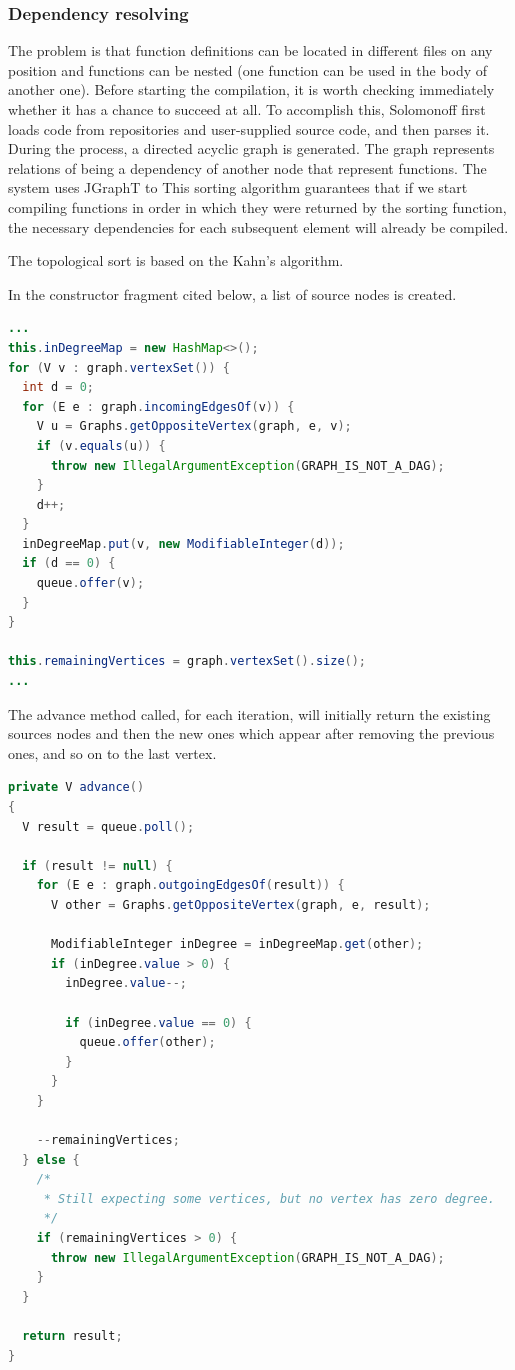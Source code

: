 \hypertarget{dependency-resolving}{%
\subsubsection{Dependency resolving}\label{dependency-resolving}}

The problem is that function definitions can be located in different
files on any position and functions can be nested (one function can be
used in the body of another one). Before starting the compilation, it is
worth checking immediately whether it has a chance to succeed at all. To
accomplish this, Solomonoff first loads code from repositories and
user-supplied source code, and then parses it. During the process,
a directed acyclic graph is
generated. The graph represents relations of being a dependency of
another node that represent functions. The system uses JGraphT to
This sorting algorithm guarantees that if we start compiling functions
in order in which they were returned by the sorting function,
the necessary dependencies for each subsequent element will already
be compiled.

The topological sort is based on the Kahn's algorithm.

In the constructor fragment cited below, a list of source nodes is
created.

\begin{lstlisting}[language=Java, frame=single]
...
this.inDegreeMap = new HashMap<>();
for (V v : graph.vertexSet()) {
  int d = 0;
  for (E e : graph.incomingEdgesOf(v)) {
    V u = Graphs.getOppositeVertex(graph, e, v);
    if (v.equals(u)) {
      throw new IllegalArgumentException(GRAPH_IS_NOT_A_DAG);
    }
    d++;
  }
  inDegreeMap.put(v, new ModifiableInteger(d));
  if (d == 0) {
    queue.offer(v);
  }
}

this.remainingVertices = graph.vertexSet().size();
...
\end{lstlisting}

The advance method called, for each iteration, will initially return the
existing sources nodes and then the new ones which appear after
removing the previous ones, and so on to the last vertex.

\begin{lstlisting}[language=Java, frame=single]
private V advance()
{
  V result = queue.poll();

  if (result != null) {
    for (E e : graph.outgoingEdgesOf(result)) {
      V other = Graphs.getOppositeVertex(graph, e, result);

      ModifiableInteger inDegree = inDegreeMap.get(other);
      if (inDegree.value > 0) {
        inDegree.value--;

        if (inDegree.value == 0) {
          queue.offer(other);
        }
      }
    }

    --remainingVertices;
  } else {
    /*
     * Still expecting some vertices, but no vertex has zero degree.
     */
    if (remainingVertices > 0) {
      throw new IllegalArgumentException(GRAPH_IS_NOT_A_DAG);
    }
  }

  return result;
}
\end{lstlisting}

